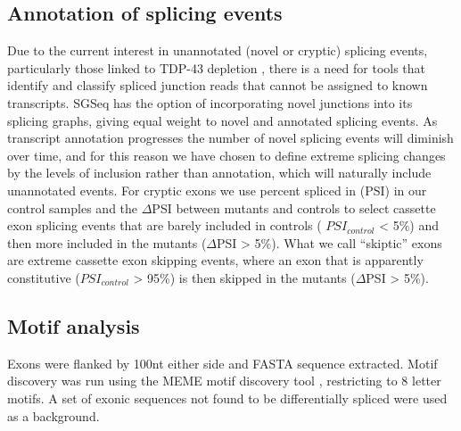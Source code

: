 \subsection{Annotation of splicing events}
Due to the current interest in unannotated (novel or cryptic) splicing events, particularly those linked to TDP-43 depletion \citep{Humphrey2017, Ling2015}, there is a need for tools that identify and classify spliced junction reads that cannot be assigned to known transcripts. SGSeq has the option of incorporating  novel  junctions  into  its  splicing  graphs,  giving  equal  weight  to  novel  and  annotated splicing events. 
As transcript annotation progresses the number of novel splicing events will diminish over time, and for this reason we have chosen to define extreme splicing changes by the levels of inclusion rather than annotation, which will naturally include unannotated events. For cryptic exons we use percent spliced  in  (PSI)  in  our  control  samples  and  the   $\Delta$PSI  between  mutants  and  controls  to  select cassette exon splicing events that are barely included in controls ( $PSI_{control}$ < 5\%) and then more included in the mutants ($\Delta$PSI > 5\%). What we call ``skiptic'' exons are extreme cassette exon skipping events, where an exon that is apparently constitutive ($PSI_{control}$ > 95\%) is then skipped in the mutants ($\Delta$PSI > 5\%).

\subsection{Motif analysis}
Exons were flanked by 100nt either side and FASTA sequence extracted. Motif discovery was run using the  MEME  motif  discovery  tool  \citep{Bailey2009-lw},  restricting  to  8  letter  motifs.  A  set  of  exonic sequences not found to be differentially spliced were used as a background. 

